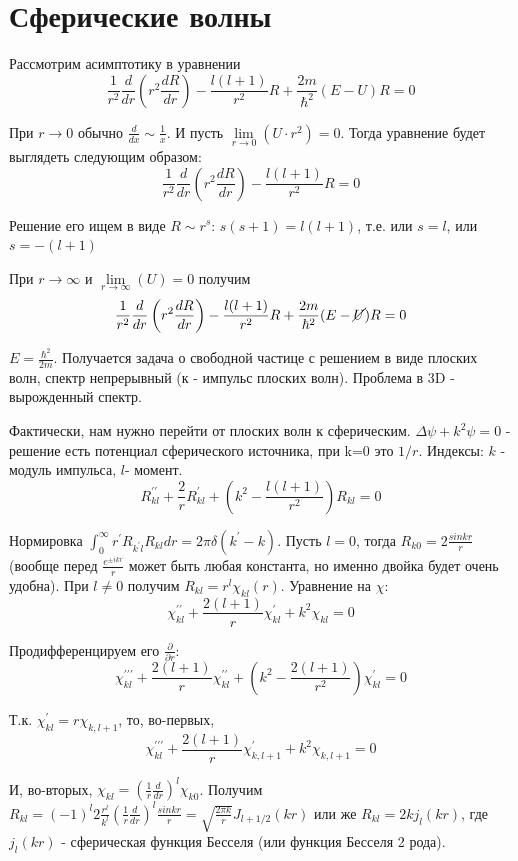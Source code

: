 \newpage
\chapter{Сферические волны}
\par Рассмотрим асимптотику в уравнении
$$  \frac{1}{r^2}\frac{d}{d r} \left(r^2  \frac{d R}{d r} \right) -  \frac{l(l+1)}{r^2} R + \frac{2m}{\hbar^2} (E-U)R =0$$
\par При $r\rightarrow 0$ обычно $\frac{d}{dx} \sim \frac{1}{x}$. И пусть $\lim\limits_{r \to 0}(U\cdot r^2)=0$. Тогда уравнение будет выглядеть следующим образом:
$$ \frac{1}{r^2}\frac{d}{d r} \left(r^2  \frac{d R}{d r} \right) -  \frac{l(l+1)}{r^2} R  =0$$
\par Решение его ищем в виде $R \sim r^s$: $s(s+1)=l(l+1)$, т.е. или $s=l$, или $s=-(l+1)$
\par При $r\rightarrow \infty$ и  $\lim\limits_{r \to \infty}(U)=0$ получим 
$$ \frac{1}{r^2}\frac{d}{d r} \left(r^2  \frac{d R}{d r} \right) -  \frac{l(l+1)}{r^2} R + \frac{2m}{\hbar^2} (E-\cancel{U})R =0$$
\par $E = \frac{\hbar^2}{2m}$. Получается задача о свободной частице с решением в виде плоских волн, спектр непрерывный (к - импульс плоских волн). Проблема в 3D - вырожденный спектр. 
\par Фактически, нам нужно перейти от плоских волн к сферическим. $\Delta \psi + k^2 \psi =0$ - решение есть потенциал сферического источника, при k=0 это $1/r$. Индексы: $k$ - модуль импульса, $l $- момент.
$$R^{\prime \prime}_{kl} + \frac{2}{r}R^\prime _{kl} +\left(k^2 - \frac{l(l+1)}{r^2} \right)R _{kl}=0$$
\par Нормировка $\int^\infty_0 r^\prime R_{k^\prime l}R_{kl}dr=2\pi \delta (k^\prime- k)$. Пусть $l=0$, тогда $R_{k0}= 2 \frac{sin kr}{r}$ (вообще перед $\frac{e^{\pm ikr}}{r}$ может быть любая константа, но именно двойка будет очень удобна). При $l \ne 0$ получим $R_{kl}= r^l \chi_{kl}(r)$. Уравнение на $\chi$:
$$\chi^{\prime \prime}_{kl} + \frac{2(l+1)}{r}\chi^{\prime}_{kl} + k^2 \chi_{kl} =0 $$
\par Продифференцируем его $\frac{\partial}{\partial r}$:
$$\chi^{\prime \prime \prime}_{kl}+ \frac{2(l+1)}{r}\chi^{\prime \prime}_{kl} + \left( k^2 - \frac{2(l+1)}{r^2} \right)\chi^{\prime}_{kl}=0 $$
\par Т.к. $\chi^{\prime}_{kl} = r \chi_{k,l+1}$, то, во-первых,
$$\chi^{\prime \prime \prime}_{kl}+ \frac{2(l+1)}{r}\chi^{\prime }_{k,l+1} +  k^2 \chi_{k,l+1}=0$$
\par И, во-вторых, $\chi_{kl}= \left(\frac{1}{r} \frac{d}{dr} \right)^l \chi_{k0}$. Получим $R_{kl} = (-1)^l 2 \frac{r^l}{k^l} \left(\frac{1}{r} \frac{d}{dr} \right)^l  \frac{sin kr}{r} = \sqrt{\frac{2 \pi k}{r}} J_{l+1/2}(kr)$ или же $R_{kl} = 2 k j_l(kr)$, где $j_l(kr)$ - сферическая функция Бесселя (или  функция Бесселя 2 рода).

